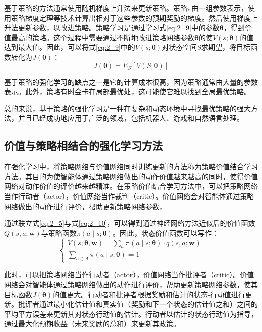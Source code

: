 基于策略的方法通常使用随机梯度上升法来更新策略。策略$\pi$由一组参数表示，使用策略梯度定理等技术计算出相对于这些参数的预期奖励的梯度。然后使用梯度上升法更新参数，以改进策略。策略学习是通过学习式\ref{eq:2_9}中的参数$\boldsymbol{\theta}$，得到价值最高的策略。这个过程中需要通过不断地改进策略网络参数$\boldsymbol{\theta}$的使$V(s;\boldsymbol{\theta})$的值达到最大值。因此，可以将式\ref{eq:2_9}中的$V(s;\boldsymbol{\theta})$对状态空间S求期望，将目标函数转化为$J(\boldsymbol{\theta})$：
\begin{equation}	
\label{eq:2_11}
J(\boldsymbol{\theta})=E_S[V(S;\boldsymbol{\theta})]
\end{equation}

基于策略的强化学习的缺点之一是它的计算成本很高，因为策略通常由大量的参数表示。此外，策略有时会卡在局部最优处，这可能使它难以找到全局最优策略。

总的来说，基于策略的强化学习是一种在复杂和动态环境中寻找最优策略的强大方法，并且已经成功地应用于广泛的领域，包括机器人、游戏和自然语言处理。

\subsection{价值与策略相结合的强化学习方法}

在强化学习中，将策略网络与价值网络同时训练更新的方法称为策略价值结合学习方法。其目的为使智能体通过策略网络做出的动作价值越来越高的同时，使得价值网络对动作价值的评价越来越精准。在策略价值结合学习方法中，可以把策略网络当作行动者（actor），价值网络当作裁判（critic）。价值网络会对智能体通过策略网络做出的动作进行评价，帮助更新策略网络参数，

通过联立式\ref{eq:2_5}与式\ref{eq:2_10}，可以得到通过神经网络方法近似后的价值函数$Q(s,a;\boldsymbol{w})$与策略函数$\pi(a\mid s;\boldsymbol{\theta})$。因此，状态价值函数可以写作：
\begin{equation}
\label{eq:2_12}
\left\{\begin{array}{c}
V(s ; \boldsymbol{\theta}, \boldsymbol{w})=\sum_a \pi(a \mid s ; \boldsymbol{\theta}) \cdot q(s, a ; \boldsymbol{w}) \\
\sum_{a \in A} \pi(a \mid s ; \boldsymbol{\theta})=1
\end{array}\right.
\end{equation}

此时，可以把策略网络当作行动者（actor），价值网络当作批评者（critic）。价值网络会对智能体通过策略网络做出的动作进行评价，帮助更新策略网络参数，使其目标函数$J(\boldsymbol{\theta})$的值更大。行动者和批评者根据奖励和估计的状态-行动值进行更新。批评者通过最小化估计值和真实值（奖励和下一个状态的估计值之和）之间的平均平方误差来更新其对状态行动值的估计。行动者以估计的状态行动值为指导，通过最大化预期收益（未来奖励的总和）来更新其政策。


